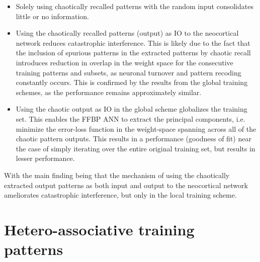 \begin{itemize}
    \item Solely using chaotically recalled patterns with the random input consolidates little or no information.
    \item Using the chaotically recalled patterns (output) as IO to the neocortical network reduces catastrophic interference. This is likely due to the fact that the inclusion of spurious patterns in the extracted patterns by chaotic recall introduces reduction in overlap in the weight space for the consecutive training patterns and subsets, as neuronal turnover and pattern recoding constantly occurs. This is confirmed by the results from the global training schemes, as the performance remains approximately similar.
    \item Using the chaotic output as IO in the global scheme globalizes the training set. This enables the FFBP ANN to extract the principal components, i.e. minimize the error-loss function in the weight-space spanning across all of the chaotic pattern outputs. This results in a performance (goodness of fit) near the case of simply iterating over the entire original training set, but results in lesser performance.
\end{itemize}

With the main finding being that the mechanism of using the chaotically extracted output patterns as both input and output to the neocortical network ameliorates catastrophic interference, but only in the local training scheme. 



\section{Hetero-associative training patterns}\label{sect:hetero-associative}

